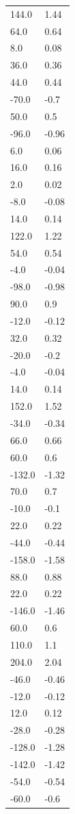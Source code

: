 \begin{longtable}{ll}
144.0 & 1.44 \\
64.0 & 0.64 \\
8.0 & 0.08 \\
36.0 & 0.36 \\
44.0 & 0.44 \\
-70.0 & -0.7 \\
50.0 & 0.5 \\
-96.0 & -0.96 \\
6.0 & 0.06 \\
16.0 & 0.16 \\
2.0 & 0.02 \\
-8.0 & -0.08 \\
14.0 & 0.14 \\
122.0 & 1.22 \\
54.0 & 0.54 \\
-4.0 & -0.04 \\
-98.0 & -0.98 \\
90.0 & 0.9 \\
-12.0 & -0.12 \\
32.0 & 0.32 \\
-20.0 & -0.2 \\
-4.0 & -0.04 \\
14.0 & 0.14 \\
152.0 & 1.52 \\
-34.0 & -0.34 \\
66.0 & 0.66 \\
60.0 & 0.6 \\
-132.0 & -1.32 \\
70.0 & 0.7 \\
-10.0 & -0.1 \\
22.0 & 0.22 \\
-44.0 & -0.44 \\
-158.0 & -1.58 \\
88.0 & 0.88 \\
22.0 & 0.22 \\
-146.0 & -1.46 \\
60.0 & 0.6 \\
110.0 & 1.1 \\
204.0 & 2.04 \\
-46.0 & -0.46 \\
-12.0 & -0.12 \\
12.0 & 0.12 \\
-28.0 & -0.28 \\
-128.0 & -1.28 \\
-142.0 & -1.42 \\
-54.0 & -0.54 \\
-60.0 & -0.6 \\

\end{longtable}
